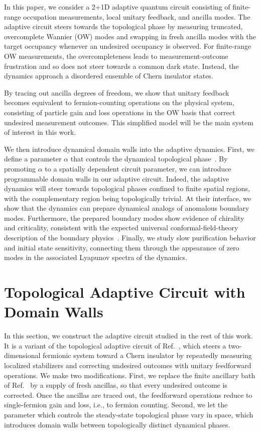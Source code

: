 \documentclass[aps,prb,twocolumn,superscriptaddress,longbibliography,floatfix]{revtex4-2}
\begin{document}
In this paper, we consider a 2+1D adaptive quantum circuit consisting of finite-range occupation measurements, local unitary feedback, and ancilla modes. The adaptive circuit steers towards the topological phase by measuring truncated, overcomplete Wannier (OW) modes and swapping in fresh ancilla modes with the target occupancy whenever an undesired occupancy is observed. For finite-range OW measurements, the overcompleteness leads to measurement-outcome frustration and so does not steer towards a common dark state. Instead, the dynamics approach a disordered ensemble of Chern insulator states.
 
By tracing out ancilla degrees of freedom, we show that unitary feedback becomes equivalent to fermion-counting operations on the physical system, consisting of particle gain and loss operations in the OW basis that correct undesired measurement outcomes. This simplified model will be the main system of interest in this work.

We then introduce dynamical domain walls into the adaptive dynamics. First, we define a parameter $\alpha$ that controls the dynamical topological phase~\cite{BhuiyanPanJian2026}. By promoting $\alpha$ to a spatially dependent circuit parameter, we can introduce programmable domain walls in our adaptive circuit. Indeed, the adaptive dynamics will steer towards topological phases confined to finite spatial regions, with the complementary region being topologically trivial. At their interface, we show that the dynamics can prepare dynamical analogs of anomalous boundary modes. Furthermore, the prepared boundary modes show evidence of chirality and criticality, consistent with the expected universal conformal-field-theory description of the boundary physics~\cite{CalabreseCardy2004}. Finally, we study slow purification behavior and initial state sensitivity, connecting them through the appearance of zero modes in the associated Lyapunov spectra of the dynamics.

\section{Topological Adaptive Circuit with Domain Walls}
\label{sec:Model}

In this section, we construct the adaptive circuit studied in the rest of this work. It is a variant of the topological adaptive circuit of Ref.~\cite{BhuiyanPanJian2026}, which steers a two-dimensional fermionic system toward a Chern insulator by repeatedly measuring localized stabilizers and correcting undesired outcomes with unitary feedforward operations. We make two modifications. First, we replace the finite ancillary bath of Ref.~\cite{BhuiyanPanJian2026} by a supply of fresh ancillas, so that every undesired outcome is corrected. Once the ancillas are traced out, the feedforward operations reduce to single-fermion gain and loss, i.e., to fermion counting. Second, we let the parameter which controls the steady-state topological phase vary in space, which introduces domain walls between topologically distinct dynamical phases.
\end{document}
